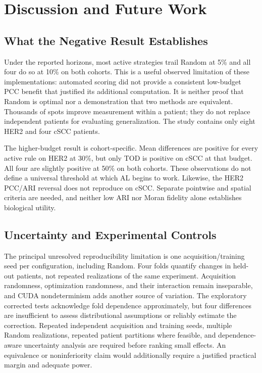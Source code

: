 \documentclass[]{spie}
\begin{document}
\section{Discussion and Future Work}
\label{sec:discussion}

\subsection{What the Negative Result Establishes}

Under the reported horizons, most active strategies trail Random at 5\% and all four do so at 10\% on both cohorts. This is a useful observed limitation of these implementations: automated scoring did not provide a consistent low-budget PCC benefit that justified its additional computation. It is neither proof that Random is optimal nor a demonstration that two methods are equivalent. Thousands of spots improve measurement within a patient; they do not replace independent patients for evaluating generalization. The study contains only eight HER2 and four cSCC patients.

The higher-budget result is cohort-specific. Mean differences are positive for every active rule on HER2 at 30\%, but only TOD is positive on cSCC at that budget. All four are slightly positive at 50\% on both cohorts. These observations do not define a universal threshold at which AL begins to work. Likewise, the HER2 PCC/ARI reversal does not reproduce on cSCC. Separate pointwise and spatial criteria are needed, and neither low ARI nor Moran fidelity alone establishes biological utility.

\subsection{Uncertainty and Experimental Controls}

The principal unresolved reproducibility limitation is one acquisition/training seed per configuration, including Random. Four folds quantify changes in held-out patients, not repeated realizations of the same experiment. Acquisition randomness, optimization randomness, and their interaction remain inseparable, and CUDA nondeterminism adds another source of variation. The exploratory corrected tests acknowledge fold dependence approximately, but four differences are insufficient to assess distributional assumptions or reliably estimate the correction. Repeated independent acquisition and training seeds, multiple Random realizations, repeated patient partitions where feasible, and dependence-aware uncertainty analysis are required before ranking small effects. An equivalence or noninferiority claim would additionally require a justified practical margin and adequate power.
\end{document}
